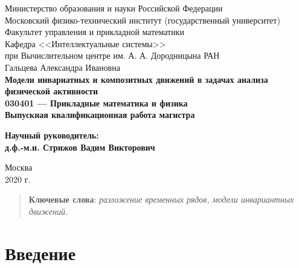 \documentclass[12pt, fleqn, unicode]{article}
\begin{document}
{
\renewcommand{\baselinestretch}{1}
\thispagestyle{empty}
\begin{center}
    \sc
        Министерство образования и науки Российской Федерации\\
        Московский физико-технический институт
        {\rm(государственный университет)}\\
        Факультет управления и прикладной математики\\
        Кафедра <<Интеллектуальные системы>>\\
        при Вычислительном центре им. А. А. Дородницына РАН\\[35mm]
    \rm\large
        Гальцева Александра Ивановна\\[10mm]
    \bf\Large
    Модели инвариатных и композитных движений в задачах анализа физической активности\\[10mm]
    \rm\normalsize
        030401 — Прикладные математика и физика\\[10mm]
    \sc
        Выпускная квалификационная работа магистра\\[30mm]
\end{center}
\hfill\parbox{80mm}{
    \begin{flushleft}
    \bf
        Научный руководитель:\\
    \rm
        д.ф.-м.н. Стрижов Вадим Викторович\\[4.9cm]
    \end{flushleft}
}
\begin{center}
    Москва\\
    2020 г.
\end{center}
}

\newpage
\tableofcontents

\newpage
\begin{abstract}


  \bigskip
    \textbf{Ключевые слова}: \emph{разложение временных рядов, модели инвариантных движений.}
\end{abstract}

\newpage
\section{Введение}
\end{document}
